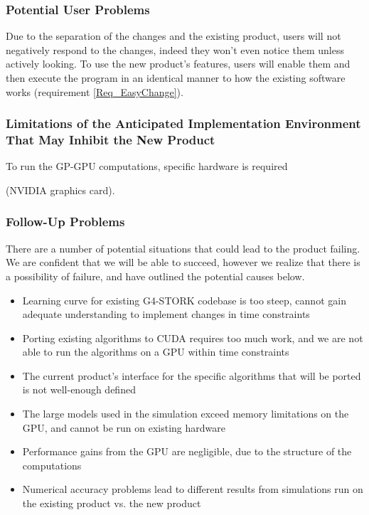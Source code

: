 \documentclass[12pt]{article}
\newcommand{\todo}[1]{\textcolor{red}{[TODO: #1]}} \else
\newcommand{\authornote}[3]{} \newcommand{\todo}[1]{} \fi
\newcommand{\ds}[1]{\authornote{blue}{DS}{#1}} %
\newcommand{\mmp}[1]{\authornote{green}{MP}{#1}}
\begin{document}
\subsubsection{Potential User Problems}
Due to the separation of the changes and the existing product, users will not negatively respond to the changes, indeed they won't even notice them unless actively looking. To use the new product's features, users will enable them and then execute the program in an identical manner to how the existing software works (requirement \ref{Req_EasyChange}).
\ds{You are again making design decisions instead of detailing potential problems
to be solved by those decisions}

\subsubsection{Limitations of the Anticipated Implementation Environment That May Inhibit the New Product}
To run the GP-GPU computations, specific hardware is required
\ds{You should stop here, unless you explained (in the constraints section)
why you need an NVIDIA card. Also, what is ``recent"?}\mmp{I explained why we need an NVIDIA card. did not explain recent. TODO}
(NVIDIA graphics card).

\subsubsection{Follow-Up Problems}
There are a number of potential situations that could lead to the product failing. We are confident that we will be able to succeed, however we realize that there is a possibility of failure, and have outlined the potential causes below.
\begin{itemize}
\item Learning curve for existing G4-STORK codebase is too steep, cannot gain adequate understanding to implement changes in time constraints
\item Porting existing algorithms to CUDA requires too much work, and we are not able to run the algorithms on a GPU within time constraints
\item The current product's interface for the specific algorithms that will be ported is not well-enough defined
\item The large models used in the simulation exceed memory limitations on the GPU, and cannot be run on existing hardware
\item Performance gains from the GPU are negligible, due to the structure of the computations
\item Numerical accuracy problems lead to different results from simulations run on the existing product vs. the new product
\end{itemize}
\end{document}
